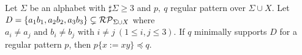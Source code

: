\begin{lem}\label{lem:3consts_iii}
  Let $\Sigma$ be an alphabet with $\sharp\Sigma \ge 3$ and $p,~q$ regular pattern {\color{red}over} $\Sigma\cup X$.
  {\color{red}Let $D=\{ a_{1}b_{1}, a_{2}b_{2}, a_{3}b_{3}\}\subsetneq \mathcal{RP}_{\Sigma\cup X}$ where $a_{i} \ne a_{j} \mbox{ and } b_{i} \ne b_{j} \mbox{ with } i\ne j ~(1\le i,j\le 3)$.
  If $q$ minimally supports $D$ for a regular pattern $p$, then $p \{ x := xy \} \preceq q$.}
\end{lem}

